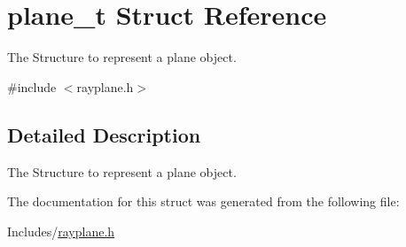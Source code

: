\hypertarget{structplane__t}{}\section{plane\+\_\+t Struct Reference}
\label{structplane__t}


The Structure to represent a plane object.  




{\ttfamily \#include $<$rayplane.\+h$>$}



\subsection{Detailed Description}
The Structure to represent a plane object. 

The documentation for this struct was generated from the following file\+:\begin{DoxyCompactItemize}
\item 
Includes/\hyperlink{rayplane_8h}{rayplane.\+h}\end{DoxyCompactItemize}
